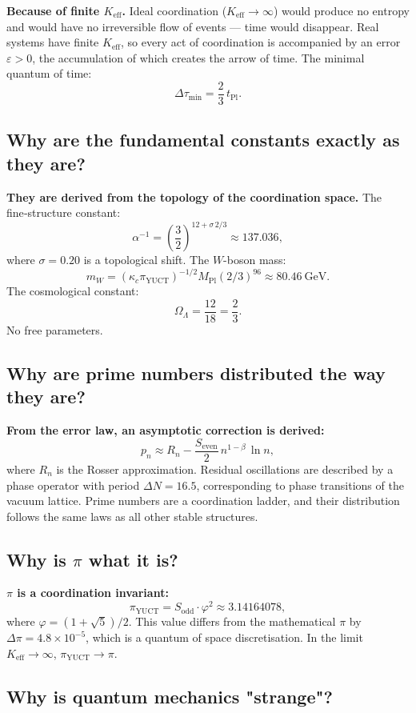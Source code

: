 \documentclass[12pt,a4paper]{article}
\newcommand{\Keff}{K_{\mathrm{eff}}}
\newcommand{\kappac}{\kappa_c}
\newcommand{\eps}{\varepsilon}
\newcommand{\betaf}{\beta}
\newcommand{\Sodd}{S_{\mathrm{odd}}}
\newcommand{\Seven}{S_{\mathrm{even}}}
\newcommand{\tPl}{t_{\mathrm{Pl}}}
\newcommand{\piYUCT}{\pi_{\mathrm{YUCT}}}
\begin{document}
	\textbf{Because of finite \(\Keff\).} Ideal coordination (\(\Keff \to \infty\)) would produce no entropy and would have no irreversible flow of events — time would disappear. Real systems have finite \(\Keff\), so every act of coordination is accompanied by an error \(\eps > 0\), the accumulation of which creates the arrow of time. The minimal quantum of time:
	\[
	\Delta \tau_{\min} = \frac{2}{3}\,\tPl.
	\]
	
	\subsection{Why are the fundamental constants exactly as they are?}
	
	\textbf{They are derived from the topology of the coordination space.} The fine‑structure constant:
	\[
	\alpha^{-1} = \left(\frac{3}{2}\right)^{12 + \sigma\,2/3} \approx 137.036,
	\]
	where \(\sigma = 0.20\) is a topological shift. The \(W\)-boson mass:
	\[
	m_W = (\kappac \piYUCT)^{-1/2} M_{\mathrm{Pl}} (2/3)^{96} \approx 80.46\ \text{GeV}.
	\]
	The cosmological constant:
	\[
	\Omega_\Lambda = \frac{12}{18} = \frac{2}{3}.
	\]
	No free parameters.
	
	\subsection{Why are prime numbers distributed the way they are?}
	
	\textbf{From the error law, an asymptotic correction is derived:}
	\[
	p_n \approx R_n - \frac{\Seven}{2}\, n^{1-\betaf}\,\ln n,
	\]
	where \(R_n\) is the Rosser approximation. Residual oscillations are described by a phase operator with period \(\Delta N = 16.5\), corresponding to phase transitions of the vacuum lattice. Prime numbers are a coordination ladder, and their distribution follows the same laws as all other stable structures.
	
	\subsection{Why is \(\pi\) what it is?}
	
	\textbf{\(\pi\) is a coordination invariant:}
	\[
	\piYUCT = \Sodd \cdot \varphi^2 \approx 3.14164078,
	\]
	where \(\varphi = (1+\sqrt{5})/2\). This value differs from the mathematical \(\pi\) by \(\Delta\pi = 4.8\times10^{-5}\), which is a quantum of space discretisation. In the limit \(\Keff \to \infty\), \(\piYUCT \to \pi\).
	
	\subsection{Why is quantum mechanics "strange"?}
	
\end{document}
